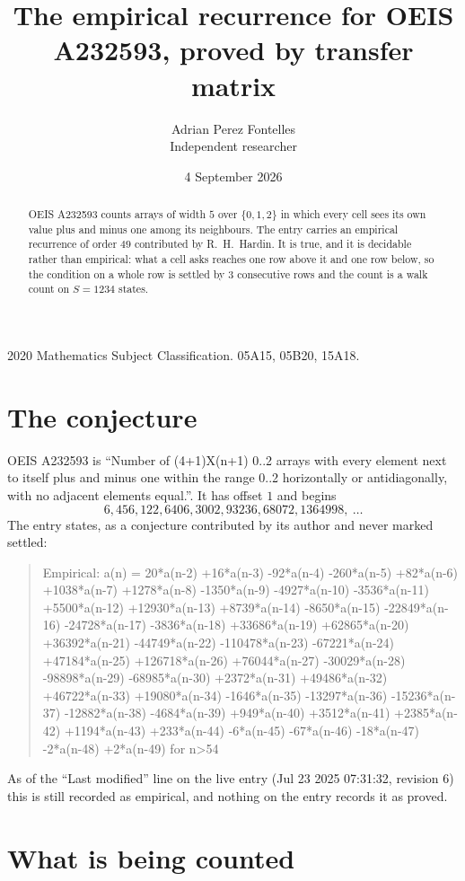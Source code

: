 \documentclass[11pt,a4paper]{article}
\title{The empirical recurrence for OEIS A232593, proved by transfer matrix}
\author{Adrian Perez Fontelles\\ \small Independent researcher}
\date{4 September 2026}
\theoremstyle{plain}
\theoremstyle{definition}
\begin{document}
\maketitle

\begin{abstract}
OEIS A232593 counts arrays of width $5$ over $\{0,1,2\}$ in which every cell sees its own value plus and minus one among its neighbours. The entry carries an
empirical recurrence of order $49$ contributed by R.~H.~Hardin. It is true, and it is
decidable rather than empirical: what a cell asks reaches one row above it and one row below, so the
condition on a whole row is settled by $3$ consecutive rows and the count is a walk
count on $S=1234$ states.
\end{abstract}

\noindent\small 2020 Mathematics Subject Classification. 05A15, 05B20, 15A18.\normalsize

\section{The conjecture}

OEIS A232593 is ``Number of (4+1)X(n+1) 0..2 arrays with every element next to itself plus and minus one within the range 0..2 horizontally or antidiagonally, with no adjacent elements equal.''. It has offset $1$ and begins
\[
6, 456, 122, 6406, 3002, 93236, 68072, 1364998,\ \dots
\]
The entry states, as a conjecture contributed by its author and never marked settled:
\begin{quote}
Empirical: a(n) = 20*a(n-2) +16*a(n-3) -92*a(n-4) -260*a(n-5) +82*a(n-6) +1038*a(n-7) +1278*a(n-8) -1350*a(n-9) -4927*a(n-10) -3536*a(n-11) +5500*a(n-12) +12930*a(n-13) +8739*a(n-14) -8650*a(n-15) -22849*a(n-16) -24728*a(n-17) -3836*a(n-18) +33686*a(n-19) +62865*a(n-20) +36392*a(n-21) -44749*a(n-22) -110478*a(n-23) -67221*a(n-24) +47184*a(n-25) +126718*a(n-26) +76044*a(n-27) -30029*a(n-28) -98898*a(n-29) -68985*a(n-30) +2372*a(n-31) +49486*a(n-32) +46722*a(n-33) +19080*a(n-34) -1646*a(n-35) -13297*a(n-36) -15236*a(n-37) -12882*a(n-38) -4684*a(n-39) +949*a(n-40) +3512*a(n-41) +2385*a(n-42) +1194*a(n-43) +233*a(n-44) -6*a(n-45) -67*a(n-46) -18*a(n-47) -2*a(n-48) +2*a(n-49) for n>54
\end{quote}
As of the ``Last modified'' line on the live entry (Jul 23 2025 07:31:32, revision 6) this is still
recorded as empirical, and nothing on the entry records it as proved.

\section{What is being counted}
\end{document}
